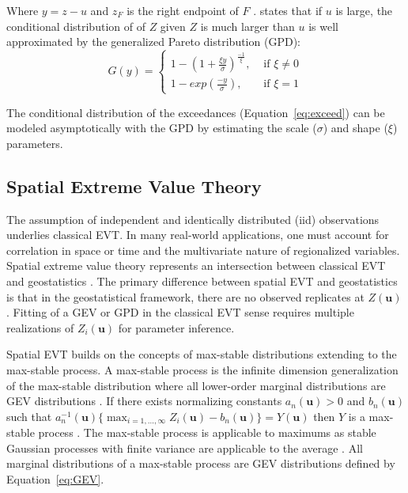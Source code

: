 Where $y = z - u$ and $z_F$ is the right endpoint of $F$ \citep{gilli2006application}. \cite{pickands1975statistical} states that if $u$ is large, the conditional distribution of of $Z$ given $Z$ is much larger than $u$ is well approximated by the generalized Pareto distribution (GPD):
\begin{equation}
    G(y) =
    \begin{cases}
        1 - \left(1 + \frac{\xi y}{\sigma}\right)^{\frac{-1}{\xi }}, & \text{ if } \xi  \neq 0 \\
        1-exp\left(\frac{-y}{\sigma} \right),                        & \text{ if } \xi  = 1
    \end{cases}
    \label{eq:GPD}
\end{equation}

The conditional distribution of the exceedances (Equation~\ref{eq:exceed}) can be modeled asymptotically with the GPD by estimating the scale ($\sigma$) and shape ($\xi$) parameters.

\FloatBarrier
\subsection{Spatial Extreme Value Theory}
\label{subsec:01spevt}

The assumption of independent and identically distributed (iid) observations underlies classical EVT. In many real-world applications, one must account for correlation in space or time and the multivariate nature of regionalized variables. Spatial extreme value theory represents an intersection between classical EVT and geostatistics \citep{neves2015geostatistical}. The primary difference between spatial EVT and geostatistics is that in the geostatistical framework, there are no observed replicates at $Z(\mathbf{u})$. Fitting of a GEV or GPD in the classical EVT sense requires multiple realizations of $Z_i(\mathbf{u})$ for parameter inference.

Spatial EVT builds on the concepts of max-stable distributions extending to the max-stable process. A max-stable process is the infinite dimension generalization of the max-stable distribution where all lower-order marginal distributions are GEV distributions \citep{schlather2003dependence}. If there exists normalizing constants $a_n(\mathbf{u}) > 0$ and $b_n(\mathbf{u})$ such that $a_n^{-1}(\mathbf{u})\{\max_{i=1,...,\infty} Z_i(\mathbf{u}) - b_n(\mathbf{u})\} = Y(\mathbf{u})$ then $Y$ is a max-stable process \citep{dehaan2007extreme}. The max-stable process is applicable to maximums as stable Gaussian processes with finite variance are applicable to the average \citep{chiles2012geostatistics}. All marginal distributions of a max-stable process are GEV distributions defined by Equation~\ref{eq:GEV}.

